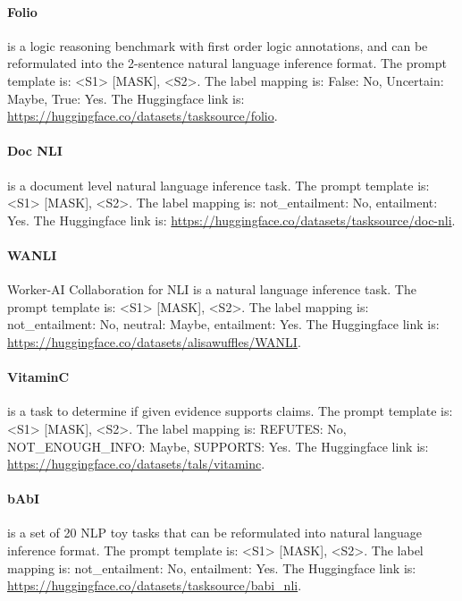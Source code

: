 \paragraph{Folio} \citep{han2022folio} is a logic reasoning benchmark with first order logic annotations, and can be reformulated into the 2-sentence natural language inference format. The prompt template is: \textless{}S1\textgreater{} {[}MASK{]}, \textless{}S2\textgreater{}. The label mapping is: False: No, Uncertain: Maybe, True: Yes. The Huggingface link is: \url{https://huggingface.co/datasets/tasksource/folio}.

\paragraph{Doc NLI} \citep{yin-etal-2021-docnli} is a document level natural language inference task. The prompt template is: \textless{}S1\textgreater{} {[}MASK{]}, \textless{}S2\textgreater{}. The label mapping is: not\_entailment: No, entailment: Yes. The Huggingface link is: \url{https://huggingface.co/datasets/tasksource/doc-nli}.

\paragraph{WANLI} Worker-AI Collaboration for NLI \citep{liu-etal-2022-wanli} is a natural language inference task. The prompt template is: \textless{}S1\textgreater{} {[}MASK{]}, \textless{}S2\textgreater{}. The label mapping is: not\_entailment: No, neutral: Maybe, entailment: Yes. The Huggingface link is: \url{https://huggingface.co/datasets/alisawuffles/WANLI}.

\paragraph{VitaminC} \citep{schuster-etal-2021-get} is a task to determine if given evidence supports claims. The prompt template is: \textless{}S1\textgreater{} {[}MASK{]}, \textless{}S2\textgreater{}. The label mapping is: REFUTES: No, NOT\_ENOUGH\_INFO: Maybe, SUPPORTS: Yes. The Huggingface link is: \url{https://huggingface.co/datasets/tals/vitaminc}.

\paragraph{bAbI} \citep{weston2015towards} is a set of 20 NLP toy tasks that can be reformulated into natural language inference format. The prompt template is: \textless{}S1\textgreater{} {[}MASK{]}, \textless{}S2\textgreater{}. The label mapping is: not\_entailment: No, entailment: Yes. The Huggingface link is: \url{https://huggingface.co/datasets/tasksource/babi_nli}.

